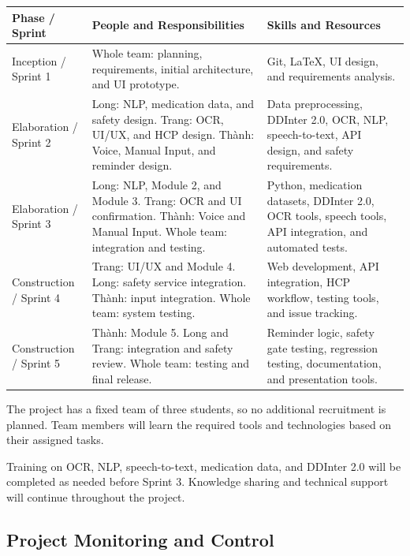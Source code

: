 \begin{longtable}{|L{0.20\textwidth}|L{0.30\textwidth}|L{0.38\textwidth}|}
\hline
\textbf{Phase / Sprint} &
\textbf{People and Responsibilities} &
\textbf{Skills and Resources}\\ \hline

Inception / Sprint 1
& Whole team: planning, requirements,
initial architecture, and UI prototype.
& Git, LaTeX, UI design,
and requirements analysis.
\\ \hline

Elaboration / Sprint 2
& Long: NLP, medication data, and safety design.
Trang: OCR, UI/UX, and HCP design.
Thành: Voice, Manual Input, and reminder design.
& Data preprocessing, DDInter 2.0,
OCR, NLP, speech-to-text, API design,
and safety requirements.
\\ \hline

Elaboration / Sprint 3
& Long: NLP, Module 2, and Module 3.
Trang: OCR and UI confirmation.
Thành: Voice and Manual Input.
Whole team: integration and testing.
& Python, medication datasets,
DDInter 2.0, OCR tools, speech tools,
API integration, and automated tests.
\\ \hline

Construction / Sprint 4
& Trang: UI/UX and Module 4.
Long: safety service integration.
Thành: input integration.
Whole team: system testing.
& Web development, API integration,
HCP workflow, testing tools,
and issue tracking.
\\ \hline

Construction / Sprint 5
& Thành: Module 5.
Long and Trang: integration and safety review.
Whole team: testing and final release.
& Reminder logic, safety gate testing,
regression testing, documentation,
and presentation tools.
\\ \hline

\end{longtable}

The project has a fixed team of three students, so no
additional recruitment is planned. Team members will
learn the required tools and technologies based on
their assigned tasks.

Training on OCR, NLP, speech-to-text, medication data,
and DDInter 2.0 will be completed as needed before
Sprint 3. Knowledge sharing and technical support
will continue throughout the project.

\subsection{Project Monitoring and Control}

